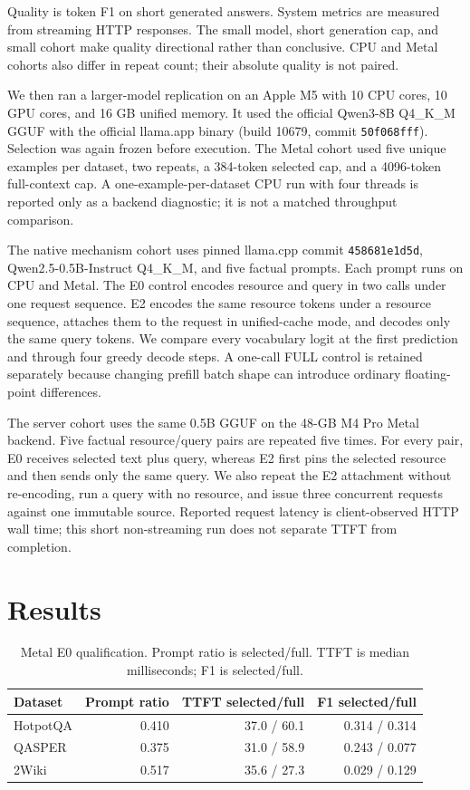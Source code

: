 \documentclass[10pt]{article}
\begin{document}
Quality is token F1 on short generated answers. System metrics are measured from
streaming HTTP responses. The small model, short generation cap, and small
cohort make quality directional rather than conclusive. CPU and Metal cohorts
also differ in repeat count; their absolute quality is not paired.

We then ran a larger-model replication on an Apple M5 with 10 CPU cores, 10 GPU
cores, and 16 GB unified memory. It used the official Qwen3-8B Q4\_K\_M GGUF
with the official llama.app binary (build 10679, commit
\texttt{50f068fff}). Selection was again frozen before execution. The Metal
cohort used five unique examples per dataset, two repeats, a 384-token selected
cap, and a 4096-token full-context cap. A one-example-per-dataset CPU run with
four threads is reported only as a backend diagnostic; it is not a matched
throughput comparison.

The native mechanism cohort uses pinned llama.cpp commit
\texttt{458681e1d5d}, Qwen2.5-0.5B-Instruct Q4\_K\_M, and five factual prompts.
Each prompt runs on CPU and Metal. The E0 control encodes resource and query in
two calls under one request sequence. E2 encodes the same resource tokens under
a resource sequence, attaches them to the request in unified-cache mode, and
decodes only the same query tokens. We compare every vocabulary logit at the
first prediction and through four greedy decode steps. A one-call FULL control
is retained separately because changing prefill batch shape can introduce
ordinary floating-point differences.

The server cohort uses the same 0.5B GGUF on the 48-GB M4 Pro Metal backend.
Five factual resource/query pairs are repeated five times. For every pair, E0
receives selected text plus query, whereas E2 first pins the selected resource
and then sends only the same query. We also repeat the E2 attachment without
re-encoding, run a query with no resource, and issue three concurrent requests
against one immutable source. Reported request latency is client-observed HTTP
wall time; this short non-streaming run does not separate TTFT from completion.

\section{Results}
\begin{table}[t]
\centering\small
\caption{Metal E0 qualification. Prompt ratio is selected/full. TTFT is median
milliseconds; F1 is selected/full.}
\begin{tabular}{lrrr}
\toprule Dataset & Prompt ratio & TTFT selected/full & F1 selected/full\\
\midrule
HotpotQA & 0.410 & 37.0 / 60.1 & 0.314 / 0.314\\
QASPER & 0.375 & 31.0 / 58.9 & 0.243 / 0.077\\
2Wiki & 0.517 & 35.6 / 27.3 & 0.029 / 0.129\\
\bottomrule
\end{tabular}
\label{tab:metal}
\end{table}
\end{document}
